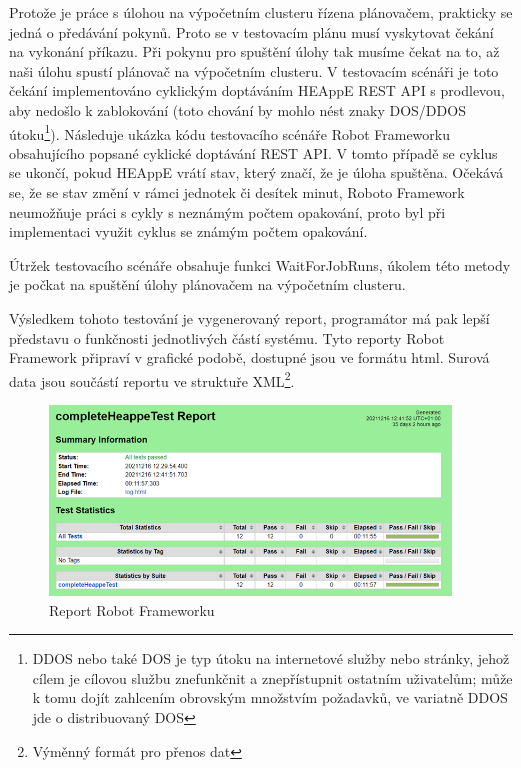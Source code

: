 Protože je práce s úlohou na výpočetním clusteru řízena plánovačem, prakticky se jedná o předávání pokynů. Proto se v testovacím plánu musí vyskytovat čekání na vykonání příkazu. Při pokynu pro spuštění úlohy tak musíme čekat na to, až naši úlohu spustí plánovač na výpočetním clusteru. V testovacím scénáři je toto čekání implementováno cyklickým doptáváním HEAppE REST API s prodlevou, aby nedošlo k zablokování (toto chování by mohlo nést znaky DOS/DDOS útoku\footnote{DDOS nebo také DOS je typ útoku na internetové služby nebo stránky, jehož cílem je cílovou službu znefunkčnit a znepřístupnit ostatním uživatelům; může k tomu dojít zahlcením obrovským množstvím požadavků, ve variatně DDOS jde o distribuovaný DOS\cite{UUBpn6UTaV8mOipc}}). Následuje ukázka kódu testovacího scénáře Robot Frameworku obsahujícího popsané cyklické doptávání REST API. V tomto případě se cyklus se ukončí, pokud HEAppE vrátí stav, který značí, že je úloha spuštěna. Očekává se, že se stav změní v rámci jednotek či desítek minut, Roboto Framework neumožňuje práci s cykly s neznámým počtem opakování, proto byl při implementaci využit cyklus se známým počtem opakování.

Útržek testovacího scénáře obsahuje funkci WaitForJobRuns, úkolem této metody je počkat na spuštění úlohy plánovačem na výpočetním clusteru.



Výsledkem tohoto testování je vygenerovaný report, programátor má pak lepší představu o funkčnosti jednotlivých částí systému. Tyto reporty Robot Framework připraví v grafické podobě, dostupné jsou ve formátu html. Surová data jsou součástí reportu ve struktuře XML\footnote{Výměnný formát pro přenos dat}.



\hfill \break





\begin{figure}[h]
	\centering
	\includegraphics[width=0.95\textwidth]{Figures/report-small.png}
	\caption{Report Robot Frameworku}
	\label{fig:WritingThesis}
\end{figure}

